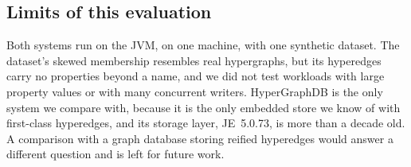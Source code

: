 \subsection{Limits of this evaluation}

Both systems run on the JVM, on one machine, with one synthetic dataset. The dataset's skewed membership resembles real hypergraphs, but its hyperedges carry no properties beyond a name, and we did not test workloads with large property values or with many concurrent writers. HyperGraphDB is the only system we compare with, because it is the only embedded store we know of with first-class hyperedges, and its storage layer, JE~5.0.73, is more than a decade old. A comparison with a graph database storing reified hyperedges would answer a different question and is left for future work.
